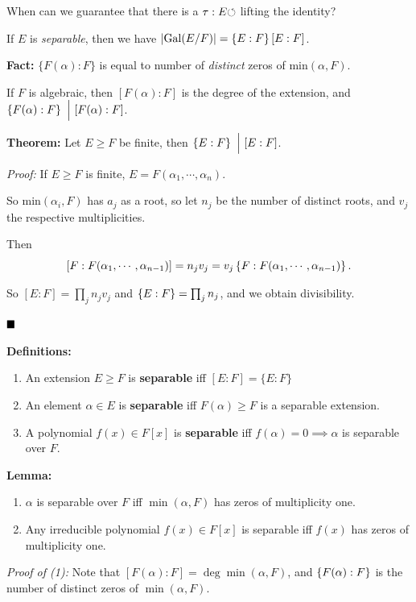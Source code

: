 When can we guarantee that there is a \(\tau: E{\circlearrowleft}\) lifting the
identity?

If \(E\) is \emph{separable}, then we have
\({\left\lvert { \mathrm{Gal}(E/F) } \right\rvert} = \left\{{E: F}\right\} [E: F]\).

\textbf{Fact:} \(\{F(\alpha): F \}\) is equal to number of
\emph{distinct} zeros of \(\mathrm{min}(\alpha, F)\).

If \(F\) is algebraic, then \([F(\alpha): F]\) is the degree of the
extension, and \(\left\{{F(\alpha): F}\right\} {~\Bigm| ~} [F(\alpha): F]\).

\textbf{Theorem:} Let \(E \geq F\) be finite, then
\(\left\{{E: F}\right\} {~\Bigm| ~} [E:F]\).

\emph{Proof:} If \(E \geq F\) is finite,
\(E = F(\alpha_1, \cdots, \alpha_n)\).

So \(\mathrm{min}(\alpha_i, F)\) has \(a_j\) as a root, so let \(n_j\)
be the number of distinct roots, and \(v_j\) the respective
multiplicities.

Then \[
[F: F(\alpha_1, \cdots, \alpha_{n-1})] = n_j v_j = v_j \left\{{F: F(\alpha_1, \cdots, \alpha_{n-1})}\right\}
.\]

So \([E: F] = \prod_j n_j v_j\) and \(\left\{{E:F}\right\} = \prod_j n_j\), and
we obtain divisibility.

\(\qed\)

\textbf{Definitions:}

\begin{enumerate}
\def\labelenumi{\arabic{enumi}.}
\item
  An extension \(E \geq F\) is \textbf{separable} iff
  \([E:F] = \{E: F\}\)
\item
  An element \(\alpha \in E\) is \textbf{separable} iff
  \(F(\alpha) \geq F\) is a separable extension.
\item
  A polynomial \(f(x) \in F[x]\) is \textbf{separable} iff
  \(f(\alpha) = 0 \implies \alpha\) is separable over \(F\).
\end{enumerate}

\textbf{Lemma:}

\begin{enumerate}
\def\labelenumi{\arabic{enumi}.}
\item
  \(\alpha\) is separable over \(F\) iff \(\min(\alpha, F)\) has zeros
  of multiplicity one.
\item
  Any irreducible polynomial \(f(x) \in F[x]\) is separable iff \(f(x)\)
  has zeros of multiplicity one.
\end{enumerate}

\emph{Proof of (1):} Note that
\([F(\alpha): F] = \deg \min(\alpha, F)\), and \(\left\{{F(\alpha): F}\right\}\)
is the number of distinct zeros of \(\min(\alpha, F)\).

